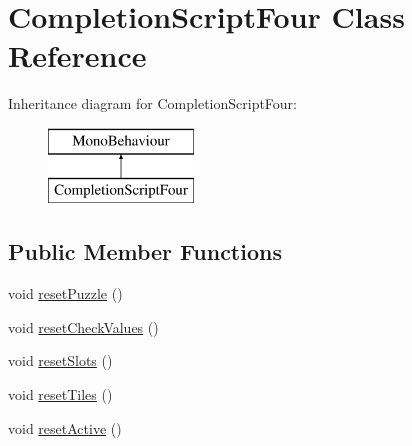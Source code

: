 \hypertarget{class_completion_script_four}{}\section{Completion\+Script\+Four Class Reference}
\label{class_completion_script_four}
Inheritance diagram for Completion\+Script\+Four\+:\begin{figure}[H]
\begin{center}
\leavevmode
\includegraphics[height=2.000000cm]{class_completion_script_four}
\end{center}
\end{figure}
\subsection*{Public Member Functions}
\begin{DoxyCompactItemize}
\item 
void \hyperlink{class_completion_script_four_ae34b24c5e0545a3e041eddda6ea06767}{reset\+Puzzle} ()
\item 
void \hyperlink{class_completion_script_four_ad52ed9205b311988a64510d048a7fbee}{reset\+Check\+Values} ()
\item 
void \hyperlink{class_completion_script_four_a91395c696c2e4425fbcd205eeccf4754}{reset\+Slots} ()
\item 
void \hyperlink{class_completion_script_four_a427cec802b76d4a42ee5b60427b34f6f}{reset\+Tiles} ()
\item 
void \hyperlink{class_completion_script_four_a49300ed9b78d89b8f68cdf6391925498}{reset\+Active} ()
\end{DoxyCompactItemize}
